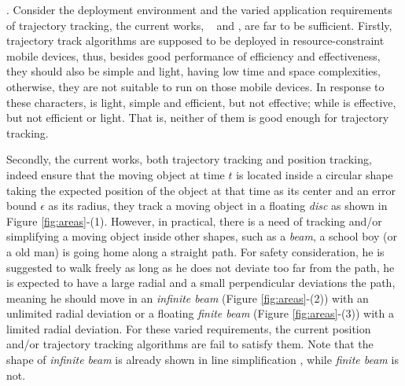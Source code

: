 . Consider the deployment environment and the varied application requirements of trajectory tracking, the current works, \ie~\ldrh \cite{Trajcevski:LDRH} and \grts \cite{Lange:GRTS,Lange:Tracking}, are far to be sufficient. Firstly, trajectory track algorithms are supposed to be deployed in resource-constraint mobile devices, thus, besides good performance of efficiency and effectiveness, they should also be simple and light, \ie having low time and space complexities, otherwise, they are not suitable to run on those mobile devices. In response to these characters, \ldrh is light, simple and efficient, but not effective; while \grts is effective, but not efficient or light. That is, neither of them is good enough for trajectory tracking.

Secondly, the current works, both trajectory tracking and position tracking, indeed ensure that the moving object at time $t$ is located inside a circular shape taking the expected position of the object at that time as its center and an error bound $\epsilon$ as its radius, \ie they track a moving object in a floating \emph{disc} as shown in Figure \ref{fig:areas}-(1). 
%
However, in practical, there is a need of tracking and/or simplifying a moving object inside other shapes, such as a \emph{beam}, \eg a school boy (or a old man) is going home along a straight path. For safety consideration, he is suggested to walk freely as long as he does not deviate too far from the path, \ie he is expected to have a large radial and a small perpendicular deviations \wrt the path, meaning he should move in an \emph{infinite beam} \cite{Chen:Space,Daescu:metric} (Figure \ref{fig:areas}-(2)) with an unlimited radial deviation or a floating \emph{finite beam} (Figure \ref{fig:areas}-(3)) with a limited radial deviation.
%
For these varied requirements, the current position and/or trajectory tracking algorithms are fail to satisfy them. Note that the shape of \emph{infinite beam} is already shown in line simplification \cite{Chen:Space,Daescu:metric}, while \emph{finite beam} is not.


